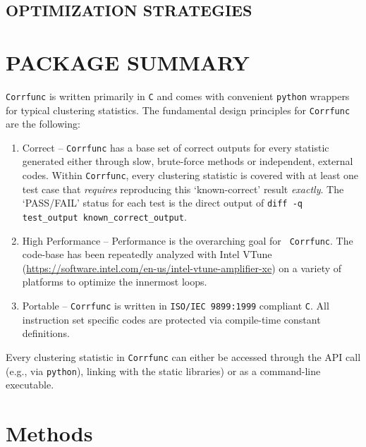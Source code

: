 \documentclass[preprint, 12pt, authoryear]{elsarticle}
\begin{document}
\subsection{OPTIMIZATION STRATEGIES}

\section{PACKAGE SUMMARY}
{\tt Corrfunc} is written primarily in {\tt C} and comes with convenient
{\tt python} wrappers for typical clustering statistics. The fundamental design
principles for {\tt Corrfunc} are the following:
\begin{enumerate}
  \item Correct -- {\tt Corrfunc} has a base set of correct outputs for every statistic
    generated either through slow, brute-force methods or independent, 
    external codes. Within {\tt Corrfunc}, every clustering statistic is covered with at least one
    test case that {\em requires} reproducing this `known-correct' result {\em
      exactly}. The `PASS/FAIL' status for each test is the direct output of {\tt diff -q
      test\_output known\_correct\_output}.  
  \item High Performance -- Performance is the overarching goal for {\tt
    Corrfunc}. The code-base has been repeatedly analyzed with Intel VTune
    (\url{https://software.intel.com/en-us/intel-vtune-amplifier-xe})
    on a variety of platforms to optimize the innermost loops. 
  \item Portable -- {\tt Corrfunc} is written in {\tt ISO/IEC 9899:1999}
    compliant {\tt C}. All instruction set specific codes are protected via compile-time constant
    definitions.
\end{enumerate}
Every clustering statistic in {\tt Corrfunc} can either be accessed through the
API call (e.g., via {\tt python}), linking with the static libraries) or as
a command-line executable. 

\section{Methods}
\end{document}
